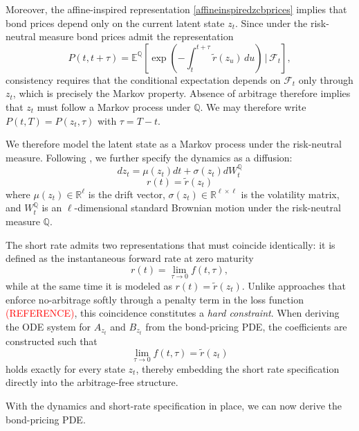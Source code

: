 Moreover, the affine-inspired representation \eqref{affineinspiredzcbprices} implies that bond prices depend only on the current latent state $z_t$. 
Since under the risk-neutral measure bond prices admit the representation
\[
P(t,t+\tau)=\mathbb{E}^{\mathbb{Q}}\!\left[\exp\!\left(-\int_t^{t+\tau} \tilde{r}(z_u)\,du\right)\,\bigg|\,\mathcal{F}_t\right],
\]
consistency requires that the conditional expectation depends on $\mathcal{F}_t$ only through $z_t$, which is precisely the Markov property. Absence of arbitrage therefore implies that $z_t$ must follow a Markov process under $\mathbb{Q}$. We may therefore write $P(t,T)=P(z_t,\tau)$ with $\tau=T-t$.




We therefore model the latent state as a Markov process under the risk-neutral measure. Following \cite{MatinWanPoulsen2025}, we further specify the dynamics as a diffusion:
\begin{equation}
    dz_t=\mu(z_t)dt+\sigma(z_t)dW_t^\mathbb{Q}
    \label{latentdynamics}
\end{equation}
\begin{equation}
    r(t)=\tilde{r}(z_t)
    \label{shortratedynamic}
\end{equation}
where $\mu(z_t)\in\mathbb{R}^\ell$ is the drift vector, $\sigma(z_t)\in\mathbb{R}^{\ell\times \ell}$ is the volatility matrix, and $W_t^\mathbb{Q}$ is an $\ell$-dimensional standard Brownian motion under the risk-neutral measure $\mathbb{Q}$.


 
The short rate admits two representations that must coincide identically: it is defined as the instantaneous forward rate at zero maturity
\[
r(t)=\lim_{\tau\to0} f(t,\tau),
\]
while at the same time it is modeled as $r(t)=\tilde{r}(z_t)$. Unlike approaches that enforce no-arbitrage softly through a penalty term in the loss function \textcolor{red}{(REFERENCE)}, this coincidence constitutes a \textit{hard constraint}. When deriving the ODE system for $A_{z_t}$ and $B_{z_t}$ from the bond-pricing PDE, the coefficients are constructed such that
\[
\lim_{\tau\to0} f(t,\tau)=\tilde r(z_t)
\]
holds exactly for every state $z_t$, thereby embedding the short rate specification directly into the arbitrage-free structure.

With the dynamics and short-rate specification in place, we can now derive the bond-pricing PDE. 



